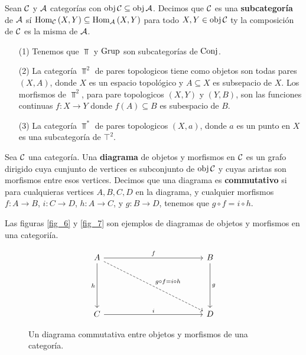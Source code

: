 \begin{definition}
    Sean $\mathcal{C}$ y  $\mathcal{A}$ categor\'ias con  $\operatorname{obj}{\mathcal{C}} \subseteq \operatorname{obj}{\mathcal{A}}$.
    Decimos que $\mathcal{C}$ es una \textbf{subcategor\'ia} de $\mathcal{A}$ s\'i
    $\operatorname{Hom}_{\mathcal{C}}{(X,Y)} \subseteq \operatorname{Hom}_{\mathcal{A}}{(X,Y)}$ para todo $X,Y \in \operatorname{obj}{\mathcal{C}}$ ty
    la composici\'on de $\mathcal{C}$ es la misma de  $\mathcal{A}$.
\end{definition}

\begin{example}\label{}
    \begin{enumerate}
        \item[(1)] Tenemos que $\Top$ y  $\operatorname{Grup}$ son subcategor\'ias de
            $\operatorname{Conj}$.
        \item[(2)] La categor\'ia $\Top^2$ de pares topologicos tiene como objetos
            son todas pares  $(X,A)$, donde $X$ es un espacio topol\'ogico y $A
            \subseteq X$ es subsepacio de $X$. Los morfismos de $\Top^2$, para
            pare topologicos  $(X,Y)$ y $(Y,B)$, son las funciones continuas
            $f:X \xrightarrow{} Y$ donde $f(A) \subseteq B$ es subespacio de $B$.

        \item[(3)] La categor\'ia $\Top^*$ de pares topologicos  $(X,a)$, donde
            $a$ es un punto en  $X$ es una subcategor\'ia de  $\top^2$.
    \end{enumerate}
\end{example}

\begin{definition}
    Sea $\mathcal{C}$ una categor\'ia. Una \textbf{diagrama} de objetos y morfismos en
    $\mathcal{C}$ es un grafo dirigido cuya cunjunto de vertices es subconjunto de
    $\operatorname{obj}{\mathcal{C}}$ y cuyas aristas son morfismos entre esos vertices. Decimos que
    una diagrama es \textbf{commutativo} si para cualquieras vertices $A,B,C,D$
    en la diagrama, y cualquier morfismos  $f:A \xrightarrow{} B$, $i:C
    \xrightarrow{} D$, $h:A \xrightarrow{} C$, y $g:B \xrightarrow{} D$, tenemos
    que $g \circ f=i \circ h$.
\end{definition}

\begin{example}\label{}
    Las figuras \ref{fig_6} y \ref{fig_7} son ejemplos de diagramas de objetos y
    morfismos en una categori\'ia.
\end{example}

\begin{figure}[h]
    \centering
    \[\begin{tikzcd}
	A &&&&& B \\
	\\
	\\
	C &&&&& D
	\arrow["f", from=1-1, to=1-6]
	\arrow["i", from=4-1, to=4-6]
	\arrow["g", from=1-6, to=4-6]
	\arrow["h"', from=1-1, to=4-1]
	\arrow["{g \circ f=i \circ h}", dashed, from=1-1, to=4-6]
\end{tikzcd}\]
    \caption{Un diagrama commutativa entre objetos y morfismos de una
    categor\'ia.}
    \label{fig_8}
\end{figure}
